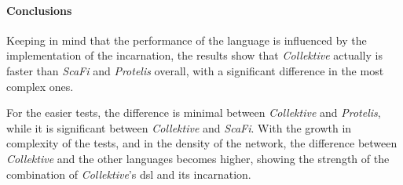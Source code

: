 \paragraph{Conclusions}
Keeping in mind that the performance of the language is influenced by the implementation of the incarnation, the results
show that \emph{Collektive} actually is faster than \emph{ScaFi} and \emph{Protelis} overall, with a significant
difference in the most complex ones.

For the easier tests, the difference is minimal between \emph{Collektive} and \emph{Protelis}, while it is significant
between \emph{Collektive} and \emph{ScaFi}.
With the growth in complexity of the tests, and in the density of the network, the difference between \emph{Collektive}
and the other languages becomes higher, showing the strength of the combination of \emph{Collektive}'s \ac{dsl} and its incarnation.

